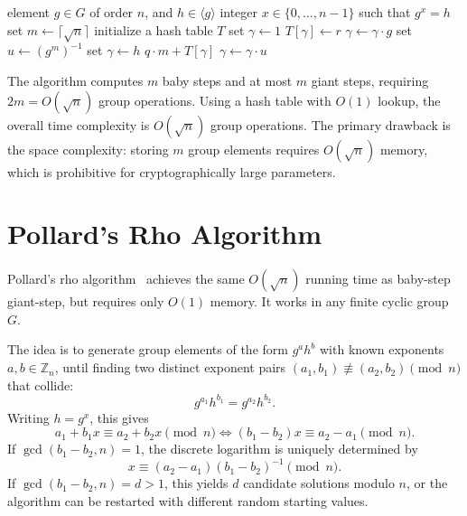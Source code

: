 \begin{algorithm}[H]
    \caption{Baby-Step Giant-Step Algorithm}\label{alg:bsgs}
    \begin{algorithmic}[1]
        \Input element \(g \in G\) of order \(n\), and \(h \in \langle g \rangle\)
        \Output integer \(x \in \{0, \dots, n-1\}\) such that \(g^x = h\)
        \State set \(m \gets \lceil \sqrt{n} \rceil\)
        \State initialize a hash table \(T\)
        \State set \(\gamma \gets 1\)
         
            \State \(T[\gamma] \gets r\)
            \State \(\gamma \gets \gamma \cdot g\)
        \EndFor
        \State set \(u \gets (g^m)^{-1}\)
        \State set \(\gamma \gets h\)
         
                \State \Return \(q \cdot m + T[\gamma]\)
            \EndIf
            \State \(\gamma \gets \gamma \cdot u\)
        \EndFor
    \end{algorithmic}
\end{algorithm}

\begin{remark}[Complexity]
    The algorithm computes \(m\) baby steps and at most \(m\) giant steps, requiring \(2m = O(\sqrt{n})\) group operations.
    Using a hash table with \(O(1)\) lookup, the overall time complexity is \(O(\sqrt{n})\) group operations.
    The primary drawback is the space complexity: storing \(m\) group elements requires \(O(\sqrt{n})\) memory, which is prohibitive for cryptographically large parameters.
\end{remark}

\section*{Pollard's Rho Algorithm}

Pollard's rho algorithm~\cite{Pollard1978} achieves the same \(O(\sqrt{n})\) running time as baby-step giant-step, but requires only \(O(1)\) memory.
It works in any finite cyclic group \(G\).

The idea is to generate group elements of the form \(g^a h^b\) with known exponents \(a, b \in \mathbb{Z}_n\), until finding two distinct exponent pairs \((a_1, b_1) \not\equiv (a_2, b_2) \pmod{n}\) that collide:
\[
    g^{a_1} h^{b_1} = g^{a_2} h^{b_2}.
\]
Writing \(h = g^x\), this gives
\[
    a_1 + b_1 x \equiv a_2 + b_2 x \pmod{n} \iff (b_1 - b_2) x \equiv a_2 - a_1 \pmod{n}.
\]
If \(\gcd(b_1 - b_2, n) = 1\), the discrete logarithm is uniquely determined by
\[
    x \equiv (a_2 - a_1)(b_1 - b_2)^{-1} \pmod{n}.
\]
If \(\gcd(b_1 - b_2, n) = d > 1\), this yields \(d\) candidate solutions modulo \(n\), or the algorithm can be restarted with different random starting values.

